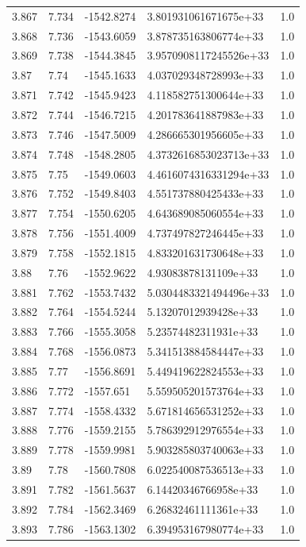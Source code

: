 \begin{tabular}{lllll}
3.867 & 7.734 & -1542.8274 & 3.801931061671675e+33 & 1.0 \\
3.868 & 7.736 & -1543.6059 & 3.878735163806774e+33 & 1.0 \\
3.869 & 7.738 & -1544.3845 & 3.9570908117245526e+33 & 1.0 \\
3.87 & 7.74 & -1545.1633 & 4.037029348728993e+33 & 1.0 \\
3.871 & 7.742 & -1545.9423 & 4.118582751300644e+33 & 1.0 \\
3.872 & 7.744 & -1546.7215 & 4.201783641887983e+33 & 1.0 \\
3.873 & 7.746 & -1547.5009 & 4.286665301956605e+33 & 1.0 \\
3.874 & 7.748 & -1548.2805 & 4.3732616853023713e+33 & 1.0 \\
3.875 & 7.75 & -1549.0603 & 4.4616074316331294e+33 & 1.0 \\
3.876 & 7.752 & -1549.8403 & 4.551737880425433e+33 & 1.0 \\
3.877 & 7.754 & -1550.6205 & 4.643689085060554e+33 & 1.0 \\
3.878 & 7.756 & -1551.4009 & 4.737497827246445e+33 & 1.0 \\
3.879 & 7.758 & -1552.1815 & 4.833201631730648e+33 & 1.0 \\
3.88 & 7.76 & -1552.9622 & 4.93083878131109e+33 & 1.0 \\
3.881 & 7.762 & -1553.7432 & 5.0304483321494496e+33 & 1.0 \\
3.882 & 7.764 & -1554.5244 & 5.13207012939428e+33 & 1.0 \\
3.883 & 7.766 & -1555.3058 & 5.23574482311931e+33 & 1.0 \\
3.884 & 7.768 & -1556.0873 & 5.341513884584447e+33 & 1.0 \\
3.885 & 7.77 & -1556.8691 & 5.449419622824553e+33 & 1.0 \\
3.886 & 7.772 & -1557.651 & 5.559505201573764e+33 & 1.0 \\
3.887 & 7.774 & -1558.4332 & 5.671814656531252e+33 & 1.0 \\
3.888 & 7.776 & -1559.2155 & 5.786392912976554e+33 & 1.0 \\
3.889 & 7.778 & -1559.9981 & 5.903285803740063e+33 & 1.0 \\
3.89 & 7.78 & -1560.7808 & 6.022540087536513e+33 & 1.0 \\
3.891 & 7.782 & -1561.5637 & 6.14420346766958e+33 & 1.0 \\
3.892 & 7.784 & -1562.3469 & 6.26832461111361e+33 & 1.0 \\
3.893 & 7.786 & -1563.1302 & 6.394953167980774e+33 & 1.0 \\

\end{tabular}
